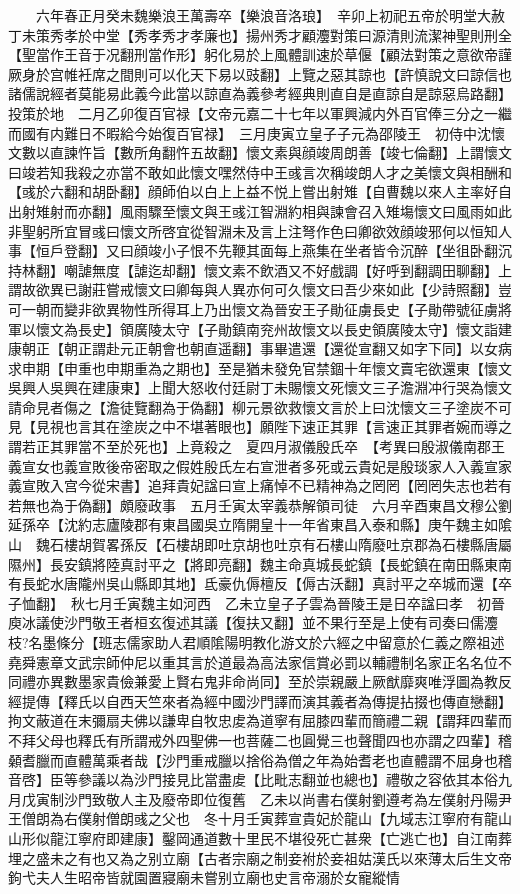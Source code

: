 　　六年春正月癸未魏樂浪王萬壽卒【樂浪音洛琅】　辛卯上初祀五帝於明堂大赦　丁未策秀孝於中堂【秀孝秀才孝廉也】揚州秀才顧灋對策曰源清則流潔神聖則刑全【聖當作王音于况翻刑當作形】躬化易於上風體訓速於草偃【顧法對策之意欲帝謹厥身於宫帷衽席之間則可以化天下易以豉翻】上覽之惡其諒也【許慎說文曰諒信也諸儒說經者莫能易此義今此當以諒直為義參考經典則直自是直諒自是諒惡烏路翻】投策於地　二月乙卯復百官禄【文帝元嘉二十七年以軍興減内外百官俸三分之一繼而國有内難日不暇給今始復百官禄】　三月庚寅立皇子子元為邵陵王　初侍中沈懷文數以直諫忤旨【數所角翻忤五故翻】懷文素與顔竣周朗善【竣七倫翻】上謂懷文曰竣若知我殺之亦當不敢如此懷文嘿然侍中王彧言次稱竣朗人才之美懷文與相酬和【彧於六翻和胡卧翻】顔師伯以白上上益不悦上嘗出射雉【自曹魏以來人主率好自出射雉射而亦翻】風雨驟至懷文與王彧江智淵約相與諫會召入雉塲懷文曰風雨如此非聖躬所宜冒彧曰懷文所啓宜從智淵未及言上注弩作色曰卿欲效顔竣邪何以恒知人事【恒戶登翻】又曰顔竣小子恨不先鞭其面每上燕集在坐者皆令沉醉【坐徂卧翻沉持林翻】嘲謔無度【謔迄却翻】懷文素不飲酒又不好戲調【好呼到翻調田聊翻】上謂故欲異已謝莊嘗戒懷文曰卿每與人異亦何可久懷文曰吾少來如此【少詩照翻】豈可一朝而變非欲異物性所得耳上乃出懷文為晉安王子勛征虜長史【子勛帶號征虜將軍以懷文為長史】領廣陵太守【子勛鎮南兖州故懷文以長史領廣陵太守】懷文詣建康朝正【朝正謂赴元正朝會也朝直遥翻】事畢遣還【還從宣翻又如字下同】以女病求申期【申重也申期重為之期也】至是猶未發免官禁錮十年懷文賣宅欲還東【懷文吳興人吳興在建康東】上聞大怒收付廷尉丁未賜懷文死懷文三子澹淵冲行哭為懷文請命見者傷之【澹徒覽翻為于偽翻】柳元景欲救懷文言於上曰沈懷文三子塗炭不可見【見視也言其在塗炭之中不堪著眼也】願陛下速正其罪【言速正其罪者婉而導之謂若正其罪當不至於死也】上竟殺之　夏四月淑儀殷氏卒　【考異曰殷淑儀南郡王義宣女也義宣敗後帝密取之假姓殷氏左右宣泄者多死或云貴妃是殷琰家人入義宣家義宣敗入宫今從宋書】追拜貴妃諡曰宣上痛悼不已精神為之罔罔【罔罔失志也若有若無也為于偽翻】頗廢政事　五月壬寅太宰義恭解領司徒　六月辛酉東昌文穆公劉延孫卒【沈約志廬陵郡有東昌國吳立隋開皇十一年省東昌入泰和縣】庚午魏主如隂山　魏石樓胡賀畧孫反【石樓胡即吐京胡也吐京有石樓山隋廢吐京郡為石樓縣唐屬隰州】長安鎮將陸真討平之【將即亮翻】魏主命真城長蛇鎮【長蛇鎮在南田縣東南有長蛇水唐隴州吳山縣即其地】氐豪仇傉檀反【傉古沃翻】真討平之卒城而還【卒子恤翻】　秋七月壬寅魏主如河西　乙未立皇子子雲為晉陵王是日卒諡曰孝　初晉庾冰議使沙門敬王者桓玄復述其議【復扶又翻】並不果行至是上使有司奏曰儒灋枝?名墨條分【班志儒家助人君順隂陽明教化游文於六經之中留意於仁義之際祖述堯舜憲章文武宗師仲尼以重其言於道最為高法家信賞必罰以輔禮制名家正名名位不同禮亦異數墨家貴儉兼愛上賢右鬼非命尚同】至於崇親嚴上厥猷靡爽唯浮圖為教反經提傳【釋氏以自西天竺來者為經中國沙門譯而演其義者為傳提拈掇也傳直戀翻】拘文蔽道在末彌扇夫佛以謙卑自牧忠䖍為道寧有屈膝四輩而簡禮二親【謂拜四輩而不拜父母也釋氏有所謂戒外四聖佛一也菩薩二也圓覺三也聲聞四也亦謂之四輩】稽顙耆臘而直體萬乘者哉【沙門重戒臘以捨俗為僧之年為始耆老也直體謂不屈身也稽音啓】臣等參議以為沙門接見比當盡䖍【比毗志翻並也總也】禮敬之容依其本俗九月戊寅制沙門致敬人主及廢帝即位復舊　乙未以尚書右僕射劉遵考為左僕射丹陽尹王僧朗為右僕射僧朗彧之父也　冬十月壬寅葬宣貴妃於龍山【九域志江寧府有龍山山形似龍江寧府即建康】鑿岡通道數十里民不堪役死亡甚衆【亡逃亡也】自江南葬埋之盛未之有也又為之别立廟【古者宗廟之制妾袝於妾祖姑漢氏以來薄太后生文帝鉤弋夫人生昭帝皆就園置寢廟未嘗别立廟也史言帝溺於女寵縱情